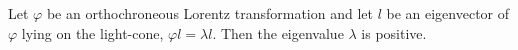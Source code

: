 Let $\varphi$ be an orthochroneous Lorentz transformation and let $l$ be an eigenvector of $\varphi$ lying on the light-cone, $\varphi l = \lambda l$. Then the eigenvalue $\lambda$ is positive.
